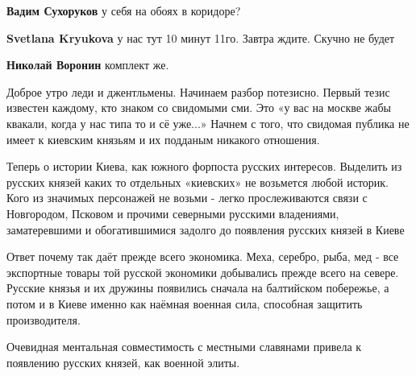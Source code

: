 \begin{itemize}
\begin{itemize}
 
\textbf{Вадим Сухоруков} у себя на обоях в коридоре?

 
\textbf{Svetlana Kryukova} у нас тут 10 минут 11го. Завтра ждите. Скучно не будет \Smiley[1.0][yellow]

 
\textbf{Николай Воронин} комплект же.


Доброе утро леди и джентльмены. Начинаем разбор потезисно. Первый тезис
известен каждому, кто знаком со свидомыми сми. Это «у вас на москве жабы
квакали, когда у нас типа то и сё уже...» Начнем с того, что свидомая публика
не имеет к киевским князьям и их подданым никакого отношения. 

Теперь о истории Киева, как южного форпоста русских интересов. Выделить из
русских князей каких то отдельных «киевских» не возьмется любой историк. Кого
из значимых персонажей не возьми - легко прослеживаются связи с Новгородом,
Псковом и прочими северными русскими владениями, заматеревшими и обогатившимися
задолго до появления русских князей в Киеве \Smiley[1.0][yellow] 

Ответ почему так даёт прежде всего экономика. Меха, серебро, рыба, мед - все
экспортные товары той русской экономики добывались прежде всего на севере.
Русские князья и их дружины появились сначала на балтийском побережье, а потом
и в Киеве именно как наёмная военная сила, способная защитить производителя. 

Очевидная ментальная совместимость с местными славянами привела к появлению
русских князей, как военной элиты. 


\end{itemize}
\end{itemize}
